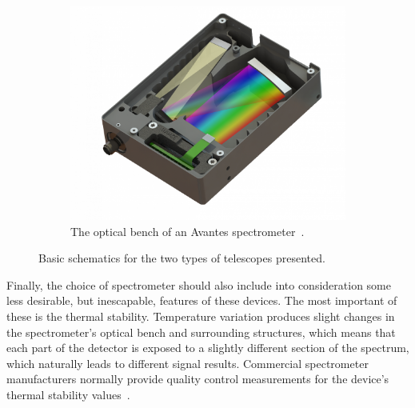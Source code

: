 \begin{figure}
      \begin{subfigure}[b]{.45\linewidth}
        \centering
        \missingfigure{}
        \caption{}\label{fig:czernyturner}
      \end{subfigure}%
      \hfill
      \begin{subfigure}[b]{.45\linewidth}
        \centering
        \includegraphics[width=.8\textwidth]{img/png/Open-Bench-V2.png}
        \caption{The optical bench of an Avantes
        spectrometer~\cite{Avantes2022}.}\label{fig:avantes_3d}
      \end{subfigure}
      \caption{Basic schematics for the two types of telescopes
      presented.}\label{fig:telescope_types_schematics}
\end{figure}

Finally, the choice of spectrometer should also include into
consideration some less desirable, but inescapable,  features of these
devices. The most important of these is the thermal stability.
Temperature variation produces slight changes in the spectrometer's
optical bench and surrounding structures, which means that each part of
the detector is exposed to a slightly different section of the spectrum,
which naturally leads to different signal results. Commercial
spectrometer manufacturers normally provide quality control measurements
for the device's thermal stability
values~\cite{Merlaud2013, Avantes2022}.
